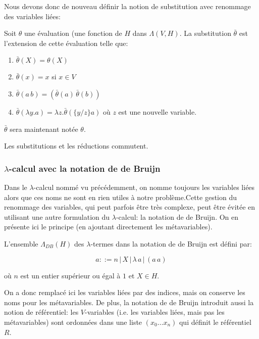 Nous devons donc de nouveau définir la notion de substitution avec renommage des variables liées:

\begin{defn}
Soit $\theta$ une évaluation (une fonction de $H$ dans $\Lambda(V,H)$. La substitution $\bar{\theta}$ est l'extension de cette évaluation telle que:
\begin{enumerate}
    \item $\bar{\theta} (X) = \theta (X)$
    \item $\bar{\theta} (x) = x$ si $x \in V$
    \item $\bar{\theta}(a \, b) = (\bar{\theta}(a) \, \bar{\theta}(b))$
    \item $\bar{\theta}(\lambda y . a) = \lambda z . \bar{\theta} (\{ y / z \} a)$ où $z$ est une nouvelle variable.
\end{enumerate}
$\bar{\theta}$ sera maintenant notée $\theta$.
\end{defn}

\begin{prop}
Les substitutions et les réductions commutent.
\end{prop}

\subsubsection{$\lambda$-calcul avec la notation de de Bruijn}

Dans le $\lambda$-calcul nommé vu précédemment, on nomme toujours les variables liées alors que ces noms ne sont en rien utiles à notre problème.Cette gestion du renommage des variables, qui peut parfois être très complexe, peut être évitée en utilisant une autre formulation du $\lambda$-calcul: la notation de de Bruijn. On en présente ici le principe (en ajoutant directement les métavariables).

\begin{defn}
L’ensemble $\Lambda_{DB}(H)$ des $\lambda$-termes dans la notation de de Bruijn est défini par:

\[ a::= n \, |\, X \,| \,\lambda \, a \,|\, (a \, a) \]

où $n$ est un entier supérieur ou égal à $1$ et $X \in H$.
\end{defn}

On a donc remplacé ici les variables liées par des indices, mais on conserve les noms pour les métavariables. De plus, la notation de de Bruijn introduit aussi la notion de référentiel: les $V$-variables (i.e. les variables liées, mais pas les métavariables) sont ordonnées dans une liste $(x_0 \dots x_n)$ qui définit le référentiel $R$.

